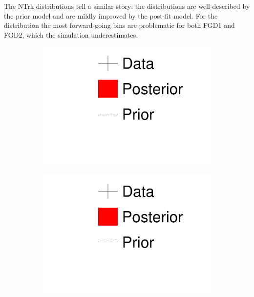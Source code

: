 The NTrk distributions tell a similar story: the \pmu distributions are well-described by the prior model and are mildly improved by the post-fit model. For the \cosmu distribution the most forward-going bins are problematic for both FGD1 and FGD2, which the simulation underestimates.
\begin{figure}[h]
	\begin{subfigure}[t]{0.15\textwidth}
		\includegraphics[width=\textwidth, trim={0mm 90mm 0mm 0mm}, clip,page=1]{figures/mach3/1D_legend_Data_Posterior_Prior}
	\end{subfigure}
	\begin{subfigure}[t]{0.15\textwidth}
		\includegraphics[width=\textwidth, trim={0mm 45mm 0mm 50mm}, clip,page=1]{figures/mach3/1D_legend_Data_Posterior_Prior}
	\end{subfigure}	\begin{subfigure}[t]{0.15\textwidth}

\end{subfigure}
\end{figure}
